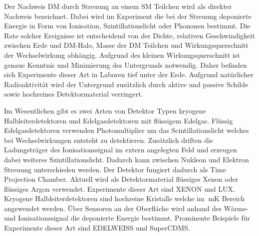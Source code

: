 Der Nachweis DM durch Streuung an einem SM Teilchen wird als direkter Nachweis bezeichnet.
Dabei wird im Experiment die bei der Streuung deponierte Energie in Form von Ionisation, Szintillationslicht oder Phononen bestimmt.
Die Rate solcher Ereignisse ist entscheidend von der Dichte, relativen Geschwindigkeit zwischen Erde und DM-Halo, Masse der DM Teilchen und Wirkungsquerschnitt der Wechselwirkung abhängig.
Aufgrund des kleinen Wirkungsquerschnitt ist genaue Kenntnis und Minimierung des Untergrunds notwendig.
Daher befinden sich Experimente dieser Art in Laboren tief unter der Erde.
Aufgrund natürlicher Radioaktivität wird der Untergrund zusätzlich durch aktive und passive Schilde sowie hochreines Detektormaterial verringert.

Im Wesentlichen gibt es zwei Arten von Detektor Typen kryogene Halbleiterdetektoren und Edelgasdetektoren mit flüssigem Edelgas.
Flüssig Edelgasdetektoren verwenden Photomultiplier um das Scintillationslicht welches bei Wechselwirkungen entsteht zu detektieren.
Zusätzlich driften die Ladungsträger des Ionisationssignal im extern angelegten Feld und erzeugen dabei weiteres Szintillationslicht.
Dadurch kann zwischen Nukleon und Elektron Streuung unterschieden werden.
Der Detektor fungiert dadurch als Time Projection Chamber.
Aktuell wird als Detektormaterial flüssiges Xenon oder flüssiges Argon verwendet.
Experimente dieser Art sind XENON\cite{Aprile2017} und LUX\cite{DaSilva2017}.
Kryogene Halbleiterdetektoren sind hochreine Kristalle welche im $\SI{}{\milli\kelvin}$ Bereich angewendet werden.
Über Sensoren an der Oberfläche wird anhand des Wärme- und Ionisationssignal die deponierte Energie bestimmt.
Prominente Beispiele für Experimente dieser Art sind EDELWEISS\cite{EDWIII} und SuperCDMS\cite{Agnese2018}.